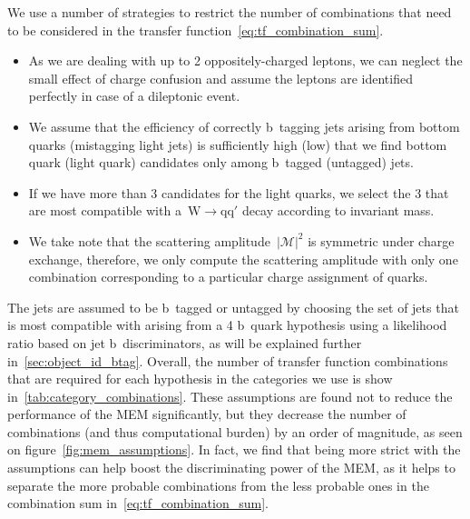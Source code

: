 We use a number of strategies to restrict the number of combinations that need to be considered in the transfer function~\cref{eq:tf_combination_sum}. 

\begin{itemize}
\item As we are dealing with up to 2 oppositely-charged leptons, we can neglect the small effect of charge confusion and assume the leptons are identified perfectly in case of a dileptonic event.
\item We assume that the efficiency of correctly b~tagging jets arising from bottom quarks (mistagging light jets) is sufficiently high (low) that we find bottom quark (light quark) candidates only among b~tagged (untagged) jets.
\item If we have more than 3 candidates for the light quarks, we select the 3 that are most compatible with a~$\mathrm{W} \rightarrow \mathrm{q}\mathrm{q}'$ decay according to invariant mass.
\item We take note that the scattering amplitude~$|\mathcal{M}|^2$ is symmetric under charge exchange, therefore, we only compute the scattering amplitude with only one combination corresponding to a particular charge assignment of quarks.
\end{itemize}
The jets are assumed to be b~tagged or untagged by choosing the set of jets that is most compatible with arising from a 4 b~quark hypothesis using a likelihood ratio based on jet b~discriminators, as will be explained further in~\cref{sec:object_id_btag}. Overall, the number of transfer function combinations that are required for each hypothesis in the categories we use is show in~\cref{tab:category_combinations}. These assumptions are found not to reduce the performance of the MEM significantly, but they decrease the number of combinations (and thus computational burden) by an order of magnitude, as seen on figure~\cref{fig:mem_assumptions}. In fact, we find that being more strict with the assumptions can help boost the discriminating power of the MEM, as it helps to separate the more probable combinations from the less probable ones in the combination sum in~\cref{eq:tf_combination_sum}.

